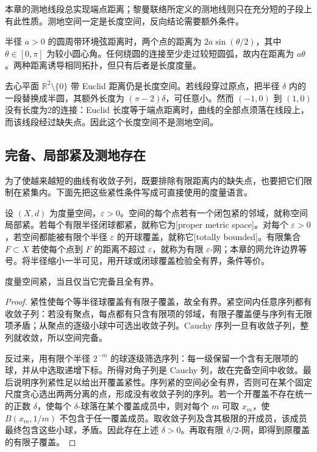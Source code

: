 本章的测地线段总实现端点距离；黎曼联络所定义的测地线则只在充分短的子段上有此性质。测地空间一定是长度空间，反向结论需要额外条件。

\begin{example}\label{g3:exm:intrinsic-metric-models}
	半径 \(a>0\) 的圆周带环境弦距离时，两个点的距离为 \(2a\sin(\theta/2)\)，其中 \(\theta\in[0,\pi]\) 为较小圆心角。任何绕圆的连接至少走过较短圆弧，故内在距离为 \(a\theta\)。两种距离诱导相同拓扑，但只有后者是长度度量。

	去心平面 \(\mathbb R^2\setminus\{0\}\) 带 Euclid 距离仍是长度空间。若线段穿过原点，把半径 \(\delta\) 内的一段替换成半圆，其额外长度为 \((\pi-2)\delta\)，可任意小。然而 \((-1,0)\) 到 \((1,0)\) 没有长度为2的连接：Euclid 长度等于端点距离时，曲线的全部点须落在线段上，而该线段经过缺失点。因此这个长度空间不是测地空间。
\end{example}

\subsection{完备、局部紧及测地存在}
\label{g3:subsec:1001:02}
为了使越来越短的曲线有收敛子列，既要排除有限距离内的缺失点，也要把它们限制在紧集内。下面先把这些紧性条件写成可直接使用的度量语言。

\begin{definition}\label{g3:def:proper-metric-space}
	设 \((X,d)\) 为度量空间，\(\varepsilon>0\)。空间的每个点若有一个闭包紧的邻域，就称空间局部紧。若每个有限半径闭球都紧，就称它为[proper metric space]。对每个 \(\varepsilon>0\)，若空间都能被有限个半径 \(\varepsilon\) 的开球覆盖，就称它[totally bounded]。有限集合 \(F\subset X\) 若使每个点到 \(F\) 的距离不超过 \(\varepsilon\)，就称为有限 \(\varepsilon\)-网；本章的网允许边界等号。将半径缩小一半可见，用开球或闭球覆盖检验全有界，条件等价。
\end{definition}

\begin{lemma}\label{g3:lem:complete-totally-bounded}
	度量空间紧，当且仅当它完备且全有界。
\end{lemma}
\begin{proof}
	紧性使每个等半径球覆盖有有限子覆盖，故全有界。紧空间内任意序列都有收敛子列：若没有聚点，每点都有只含有限项的邻域，有限子覆盖便与序列有无限项矛盾；从聚点的逐级小球中可选出收敛子列。Cauchy 序列一旦有收敛子列，整列就收敛，所以空间完备。

	反过来，用有限个半径 \(2^{-m}\) 的球逐级筛选序列：每一级保留一个含有无限项的球，并从中选取递增下标。所得对角子列是 Cauchy 列，故在完备空间中收敛。最后说明序列紧性足以给出开覆盖紧性。序列紧的空间必全有界，否则可在某个固定尺度贪心选出两两分离的点，形成没有收敛子列的序列。若一个开覆盖不存在统一的正数 \(\delta\)，使每个 \(\delta\)-球落在某个覆盖成员中，则对每个 \(m\) 可取 \(x_m\)，使 \(B(x_m,1/m)\) 不包含于任一覆盖成员。取收敛子列及含其极限的开成员，该成员最终包含这些小球，矛盾。因此存在上述 \(\delta>0\)。再取有限 \(\delta/2\)-网，即得到原覆盖的有限子覆盖。
\end{proof}

